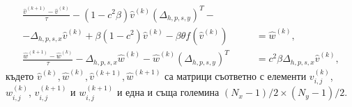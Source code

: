 \documentclass[a4paper]{article}
\theoremstyle{remark}
\begin{document}
\begin{equation}\label{eq555}
\begin{split}
\frac {\widehat{v}^{(k+1)}-\widehat{v}^{(k)}}{\tau}- (1-c^2 \beta) \widehat{v}^{(k)}  (\Delta_{h,p,s,y})^T - \quad\quad\quad\;&\\
-\Delta_{h,p,s,x}  \widehat{v}^{(k)}+ \beta (1-c^2 ) \widehat{v}^{(k)} - \beta \theta f(\widehat{v}^{(k)}) &= \widehat{w}^{(k)}, \\
\frac  {\widehat{w}^{(k+1)} -\widehat{w}^{(k)}} {\tau} - \Delta_{h,p,s,x}  \widehat{w}^{(k)} - \widehat{w}^{(k)}  (\Delta_{h,p,s,y})^T &=  c^2 \beta \Delta_{h,p,s,x}  \widehat{v}^{(k)},
\end{split}
\end{equation}
където $\widehat{v}^{(k)}, \widehat{w}^{(k)}, \widehat{v}^{(k+1)}, \widehat{w}^{(k+1)}$ са матрици съответно с елементи ${v}_{i,j}^{(k)}$, ${w}_{i,j}^{(k)}$, ${v}_{i,j}^{(k+1)}$ и ${w}_{i,j}^{(k+1)}$ и една и съща големина $(N_x-1)/2 \times (N_y-1)/2$.
\end{document}
